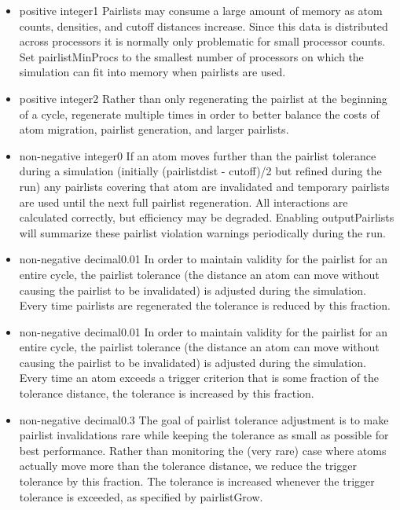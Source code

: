 \begin{itemize}
\item
{}
{positive integer}{1}
{
Pairlists may consume a large amount of memory as atom counts, densities,
and cutoff distances increase.  Since this data is distributed across
processors it is normally only problematic for small processor counts.
Set pairlistMinProcs to the smallest number of processors on which
the simulation can fit into memory when pairlists are used.
}

\item
{}
{positive integer}{2}
{
Rather than only regenerating the pairlist at the beginning of a cycle,
regenerate multiple times in order to better balance the costs of
atom migration, pairlist generation, and larger pairlists.
}

\item
{}
{non-negative integer}{0}
{
If an atom moves further than the pairlist tolerance during a simulation
(initially (pairlistdist - cutoff)/2 but refined during the run) any
pairlists covering that atom are invalidated and temporary pairlists
are used until the next full pairlist regeneration.  All interactions
are calculated correctly, but efficiency may be degraded.  Enabling
outputPairlists will summarize these pairlist violation warnings
periodically during the run.
}

\item
{}
{non-negative decimal}{0.01}
{
In order to maintain validity for the pairlist for an entire cycle,
the pairlist tolerance (the distance an atom can move without causing
the pairlist to be invalidated) is adjusted during the simulation.
Every time pairlists are regenerated the tolerance is reduced by
this fraction.
}

\item
{}
{non-negative decimal}{0.01}
{
In order to maintain validity for the pairlist for an entire cycle,
the pairlist tolerance (the distance an atom can move without causing
the pairlist to be invalidated) is adjusted during the simulation.
Every time an atom exceeds a trigger criterion that is some fraction
of the tolerance distance, the tolerance is increased by this fraction.
}

\item
{}
{non-negative decimal}{0.3}
{
The goal of pairlist tolerance adjustment is to make pairlist invalidations
rare while keeping the tolerance as small as possible for best performance.
Rather than monitoring the (very rare) case where atoms actually move more
than the tolerance distance, we reduce the trigger tolerance by this
fraction.  The tolerance is increased whenever the trigger tolerance is
exceeded, as specified by pairlistGrow.
}

\end{itemize}

